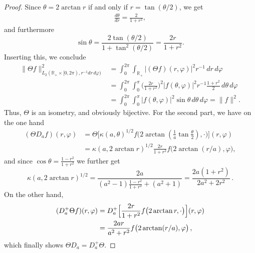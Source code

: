 \documentclass[a4paper,11pt,DIV=11,%
abstract=on%
]{scrartcl}
\def\R{{\mathbb R}}
\begin{document}
\begin{proof}
	Since $\theta=2\arctan r$ if and only if $ r=\tan(\theta/2)$, we get
	\begin{align*}
		\frac{d\theta}{dr}=\frac{2}{1+r^2},
	\end{align*}
	and furthermore
	$$\sin\theta=\frac{2\tan(\theta/2)}{1+\tan^2(\theta/2)}=\frac{2r}{1+r^2}.$$
	Inserting this, we conclude
	\begin{align*}
		\|\Theta f\|^2_{L_2(\R_+\times[0,2\pi),r^{-1}dr\,d\varphi)}
		&=\int_0^{2\pi}\int_{\R_+}|(\Theta f)(r,\varphi)|^2 r^{-1}\,dr\,d\varphi\\
		&=\int_0^{2\pi}\int_0^\pi\biggl(\frac{2r}{1+r^2}\biggr)^2
		|f(\theta,\varphi)|^2 r^{-1}\frac{1+r^2}{2}	\,d\theta\,d\varphi\\
		&=\int_0^{2\pi}\int_0^\pi|f(\theta,\varphi)|^2 \sin\theta\,d\theta\,d\varphi
		=\|f\|^2.
	\end{align*}
	Thus, $\Theta$ is an isometry, and obviously bijective. For the second part, we
	have on the one hand
	\begin{align*}
		(\Theta D_a f)(r,\varphi)
		&=\Theta\bigl[\kappa(a,\theta)^{1/2}
		f\bigl(2\arctan(\tfrac{1}{a}\tan\tfrac{\theta}{2}),\cdot\bigr)\bigr](r,\varphi)\\
		&=\kappa(a,2\arctan r)^{1/2}\frac{2r}{1+r^2}f\bigl(2\arctan(r/a),\varphi\bigr),
	\end{align*}
	and since  $\cos\theta=\frac{1-r^2}{1+r^2}$ we further get
	$$\kappa(a,2\arctan r)^{1/2}
	=\frac{2a}{(a^2-1)\frac{1-r^2}{1+r^2}+(a^2+1)}
	=\frac{2a(1+r^2)}{2a^2+2r^2}\,.$$
	On the other hand,
	\begin{align*}
		(D_a^+\Theta f)(r,\varphi)
		&=D_a^+\Bigl[\frac{2r}{1+r^2}f\bigl(2\arctan r,\cdot\bigr)\Bigr](r,\varphi)\\
		&=\frac{2ar}{a^2+r^2}f\bigl(2\arctan(r/a),\varphi\bigr)\,,
	\end{align*}
	which finally shows $\Theta D_a=D_a^+\Theta$.
\end{proof}
\end{document}

